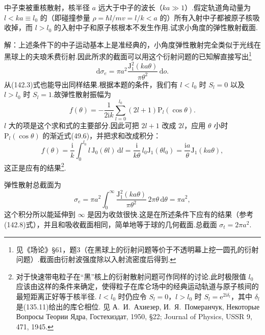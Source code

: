 \begin{xiti}

\quad 中子束被重核散射，核半径 $a$ 远大于中子的波长（$ka\gg1$）.假定轨道角动量为 $l<ka\equiv l_0$ 的（即碰撞参量 $\rho=\hbar l/mv=l/k<a$ 的）所有入射中子都被原子核吸收掉，而 $l>l_0$ 的入射中子和原子核根本不发生作用.试求小角度的弹性散射截面.

解：上述条件下的中子运动基本上是准经典的，小角度弹性散射完全类似于光线在黑球上的夫琅禾费衍射.因此所求的截面可以用这个衍射问题的已知解直接写出\footnote{见《场论》§61，题3（在黑球上的衍射问题等价于不透明幕上挖一圆孔的衍射问题）.截面由衍射波强度除以入射流密度后得到.}
\begin{equation*}
  \mathrm{d}\sigma_e=\pi a^2\frac{\mathrm{J}_1^2(ka\theta)}{\pi\theta^2}\,\mathrm{d}o.
\end{equation*}
从(142.3)式也能导出同样结果.根据本题的条件，我们有 $l<l_0$ 时 $S_l=0$ 以及 $l>l_0$ 时 $S_l=1$.故弹性散射振幅为
\begin{equation*}
  f(\theta)=-\frac{1}{2\mathrm{i}k}\sum_{l=0}^{l_0}(2l+1)\mathrm{P}_l(\cos\theta).
\end{equation*}
$l$ 大的项是这个求和式的主要部分.因此可把 $2l+1$ 改成 $2l$，应用 $\theta$ 小时 $\mathrm{P}_l(\cos\theta)$ 的渐近式(49.6)，并把求和改成积分：
\begin{equation*}
  f(\theta)=\frac{\mathrm{i}}{k}\int_0^{l_0}l\,\mathrm{J}_0(\theta l)\,\mathrm{d}l
  =\frac{\mathrm{i}}{k\theta}\,l_0\mathrm{J}_1(\theta l_0)
  =\frac{\mathrm{i}a}{\theta}\mathrm{J}_1(ka\theta),
\end{equation*}
这正是应有的结果\footnote{对于快速带电粒子在“黑”核上的衍射散射问题可作同样的讨论.此时极限值 $l_0$ 应该由这样的条件来确定，使得粒子在库仑场中的经典运动轨道与原子核间的最短距离正好等于核半径. $l<l_0$ 时仍应令 $S_l=0$，$l>l_0$ 时 $S_l=\mathrm{e}^{2\mathrm{i}\delta_l}$，其中 $\delta_l$ 是(135.11)给出的库仑相位. 见 А.~И.~Ахиезер, И.~Я.~Померанчук, Некоторые Вопросы Теории Ядра, Гостехиздат, 1950, §22; Journal of Physics, USSR 9, 471, 1945.}.

弹性散射总截面为
\begin{equation*}
  \sigma_e=\pi a^2\int_0^{\infty}\frac{\mathrm{J}_1^2(ka\theta)}{\pi\theta^2}\,2\pi\theta\,\mathrm{d}\theta
  =\pi a^2,
\end{equation*}
这个积分所以能延伸到 $\infty$ 是因为收敛很快.这是在所述条件下应有的结果（参考(142.8)式），并且和吸收截面相同，简单地等于球的几何截面.总截面 $\sigma_t=2\pi a^2$.

\end{xiti}

